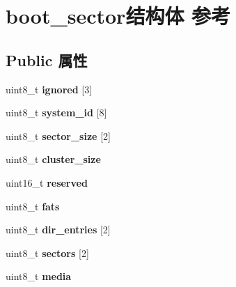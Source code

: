 \hypertarget{structboot__sector}{}\section{boot\+\_\+sector结构体 参考}
\label{structboot__sector}
\subsection*{Public 属性}
\begin{DoxyCompactItemize}
\item 
\mbox{\label{structboot__sector_ace61ed0ab1530a9137a6cb7170dd6f5e}} 
uint8\+\_\+t {\bfseries ignored} \mbox{[}3\mbox{]}
\item 
\mbox{\label{structboot__sector_adb904165e237fc04d568f7470c86b372}} 
uint8\+\_\+t {\bfseries system\+\_\+id} \mbox{[}8\mbox{]}
\item 
\mbox{\label{structboot__sector_a114b6e7f26d24bebe91bb53ba7822bcd}} 
uint8\+\_\+t {\bfseries sector\+\_\+size} \mbox{[}2\mbox{]}
\item 
\mbox{\label{structboot__sector_ab4d91706ea8c69c45bc4ee9fc4a1a4f1}} 
uint8\+\_\+t {\bfseries cluster\+\_\+size}
\item 
\mbox{\label{structboot__sector_a42af9e09d607a0b653c9bb05a2ad5c3d}} 
uint16\+\_\+t {\bfseries reserved}
\item 
\mbox{\label{structboot__sector_a771e425873c7ec780e6ffa17263107c2}} 
uint8\+\_\+t {\bfseries fats}
\item 
\mbox{\label{structboot__sector_a1e6c631b4b8cd420dbe665968a283ac0}} 
uint8\+\_\+t {\bfseries dir\+\_\+entries} \mbox{[}2\mbox{]}
\item 
\mbox{\label{structboot__sector_ad9c18af3e0e00a874cbb044423686a69}} 
uint8\+\_\+t {\bfseries sectors} \mbox{[}2\mbox{]}
\item 
\mbox{\label{structboot__sector_a6de1f7866da21aad3da10148e8cb5485}} 
uint8\+\_\+t {\bfseries media}

\end{DoxyCompactItemize}
